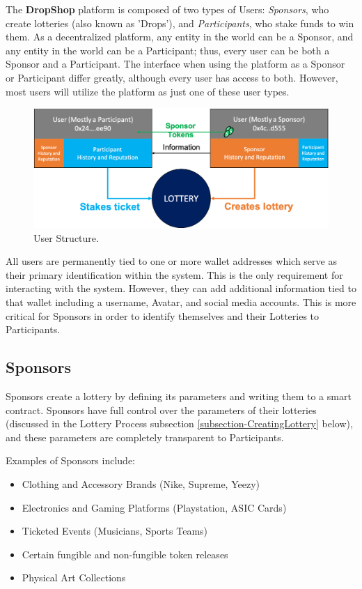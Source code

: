 \documentclass[runningheads]{llncs}
\begin{document}
The \textbf{DropShop} platform is composed of two types of Users: \emph{Sponsors}, who create lotteries (also known as 'Drops'), and \emph{Participants}, who stake funds to win them.  As a decentralized platform, any entity in the world can be a Sponsor, and any entity in the world can be a Participant; thus, every user can be both a Sponsor and a Participant.  The interface when using the platform as a Sponsor or Participant differ greatly, although every user has access to both.  However, most users will utilize the platform as just one of these user types.

\begin{figure}[H]
\centering
\includegraphics[scale=0.5]{Figures_and_Tables/User_Structure.png}
\caption{User Structure.}
\end{figure}

All users are permanently tied to one or more wallet addresses which serve as their primary identification within the system.  This is the only requirement for interacting with the system. However, they can add additional information tied to that wallet including a username, Avatar, and social media accounts.  This is more critical for Sponsors in order to identify themselves and their Lotteries to Participants.

\subsection{Sponsors}\label{subsection-Sponsors}
Sponsors create a lottery by defining its parameters and writing them to a smart contract.  Sponsors have full control over the parameters of their lotteries (discussed in the Lottery Process subsection \ref{subsection-CreatingLottery} below), and these parameters are completely transparent to Participants.   

Examples of Sponsors include:
\begin{itemize}
\item Clothing and Accessory Brands (Nike, Supreme, Yeezy)
\item Electronics and Gaming Platforms (Playstation, ASIC Cards)
\item Ticketed Events (Musicians, Sports Teams)
\item Certain fungible and non-fungible token releases
\item Physical Art Collections
\end{itemize}
\end{document}
